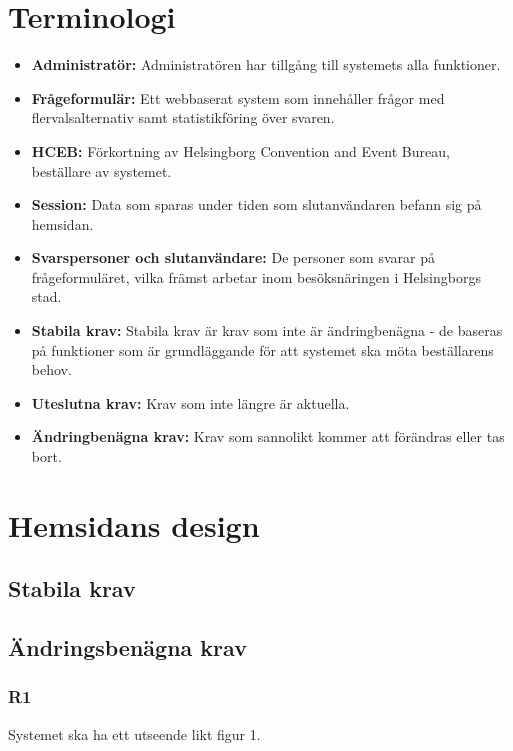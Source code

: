 \documentclass{article}
\begin{document}
    \section{Terminologi}
    \begin{itemize}
        \item \textbf{Administratör:} Administratören har tillgång till systemets alla funktioner.
         \item \textbf{Frågeformulär:} Ett webbaserat system som innehåller frågor med flervalsalternativ samt statistikföring över svaren.
        \item \textbf{HCEB:} Förkortning av Helsingborg Convention and Event Bureau, beställare av systemet.
        \item \textbf{Session:} Data som sparas under tiden som slutanvändaren befann sig på hemsidan.
        \item \textbf{Svarspersoner och slutanvändare:}  De personer som svarar på frågeformuläret, vilka främst arbetar inom besöksnäringen i Helsingborgs stad. 
        \item\textbf{Stabila krav:}  Stabila krav är krav som inte är ändringbenägna - de baseras på funktioner som är grundläggande för att systemet ska möta beställarens behov.
         \item \textbf{Uteslutna krav:}  Krav som inte längre är aktuella.
        \item \textbf{Ändringbenägna krav:}  Krav som sannolikt kommer att förändras eller tas bort.
       
    \end{itemize}
    \newpage
    \section{Hemsidans design}
    
    \subsection*{Stabila krav}
     
    \subsection*{Ändringsbenägna krav}
     \subsubsection*{R1}
    Systemet ska ha ett utseende likt figur 1.
    
\end{document}
